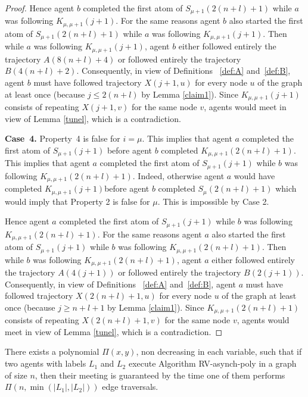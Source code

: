 \documentclass [11pt] {article}
\begin{document}
\begin{proof}
Hence agent $b$ completed the first atom of $S_{{\mu+1}}(2(n+l)+1)$ while $a$ was following $K_{{\mu,\mu+1}}(j+1)$.  For the same reasons agent $b$ also started the first atom of $S_{{\mu+1}}(2(n+l)+1)$ while $a$ was following $K_{{\mu,\mu+1}}(j+1)$.  Then while $a$ was following $K_{{\mu,\mu+1}}(j+1)$,  agent $b$ either followed entirely the trajectory $A(8(n+l)+4)$ or followed entirely the trajectory $B(4(n+l)+2)$.  Consequently, in view of Definitions ~\ref{def:A} and~\ref{def:B}, agent $b$ must have followed trajectory $X(j+1,u)$ for every node $u$ of the graph at least once  (because $j\le 2(n+l)$ by Lemma \ref{claim1}). Since $K_{{\mu,\mu+1}}(j+1)$ consists of repeating $X(j+1,v)$ for the same node $v$,  agents would meet in view of Lemma \ref{tunel}, which is a contradiction.

{\bf Case~4.} Property~4 is false for $i=\mu$. This implies that agent $a$ completed the first atom of  $S_{{\mu+1}}(j+1)$ before agent $b$ completed 
$K_{{\mu,\mu+1}}(2(n+l)+1)$. This implies that agent $a$ completed the first atom of  $S_{{\mu+1}}(j+1)$ while $b$ was following $K_{{\mu,\mu+1}}(2(n+l)+1)$. Indeed, otherwise agent $a$ would have completed $K_{{\mu,\mu+1}}(j+1)$before agent $b$ completed $S_{{\mu}}(2(n+l)+1)$ which would imply that Property 2 is false for $\mu$. This
is impossible by Case 2.

Hence agent $a$ completed the first atom of $S_{{\mu+1}}(j+1)$ while $b$ was following  $K_{{\mu,\mu+1}}(2(n+l)+1)$. For the same reasons agent $a$ also started the first atom of  $S_{{\mu+1}}(j+1)$ while $b$ was following $K_{{\mu,\mu+1}}(2(n+l)+1)$.  Then while $b$ was following
$K_{{\mu,\mu+1}}(2(n+l)+1)$, agent $a$ either followed entirely the trajectory $A(4(j+1))$ or followed entirely the trajectory $B(2(j+1))$.  Consequently,  in view of Definitions ~\ref{def:A} and~\ref{def:B},  agent $a$ must have followed trajectory $X(2(n+l)+1,u)$ for every node $u$ of the graph at least once (because  $j\ge n+l+1$ by Lemma \ref{claim1}). Since $K_{{\mu,\mu+1}}(2(n+l)+1)$ consists of repeating $X(2(n+l)+1,v)$ for the same node $v$,  agents would meet in view of Lemma \ref{tunel}, which is a contradiction.
\end{proof}
















\begin{theorem}\label{main}
There exists a polynomial $\Pi(x,y)$, non decreasing in each variable, such that
if two agents with labels $L_1$ and $L_2$ execute Algorithm RV-asynch-poly in a graph of size $n$, then their meeting is guaranteed by the time one of them performs $\Pi(n,\min(|L_1|,|L_2|))$ edge traversals. 
\end{theorem}
\end{document}
